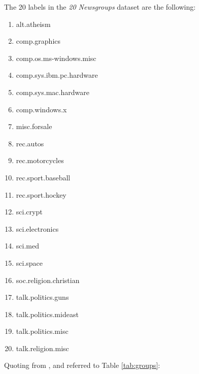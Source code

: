 \documentclass[10pt,journal,compsoc, onecolumn]{IEEEtran}
\begin{document}
The 20 labels in the \textit{20 Newsgroups} dataset are the following:

\begin{multicols}{2}
\begin{enumerate}
    \item alt.atheism
    \item comp.graphics
    \item comp.os.ms-windows.misc
    \item comp.sys.ibm.pc.hardware
    \item comp.sys.mac.hardware
    \item comp.windows.x
    \item misc.forsale
    \item rec.autos
    \item rec.motorcycles
    \item rec.sport.baseball
    \item rec.sport.hockey
    \item sci.crypt
    \item sci.electronics
    \item sci.med
    \item sci.space
    \item soc.religion.christian
    \item talk.politics.guns
    \item talk.politics.mideast
    \item talk.politics.misc
    \item talk.religion.misc
\end{enumerate}
\end{multicols}

Quoting from \cite{20Newsgroups}, and referred to Table \ref{tab:groups}:

\end{document}
